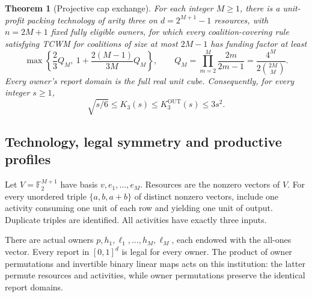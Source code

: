 \documentclass[11pt]{article}
\newtheorem{theorem}{Theorem}[section]
\theoremstyle{definition}\newtheorem{definition}[theorem]{Definition}
\theoremstyle{remark}\newtheorem{remark}[theorem]{Remark}
\begin{document}
\begin{theorem}[Projective cap exchange]\label{thm:projective}
For each integer $M\ge1$, there is a unit-profit packing technology of arity
three on $d=2^{M+1}-1$ resources, with $n=2M+1$ fixed fully eligible owners,
for which every coalition-covering rule satisfying TCWM for coalitions of
size at most $2M-1$ has funding factor at least
\begin{equation}\label{eq:projective-finite}
 \max\left\{\frac23 Q_M,\ 1+\frac{2(M-1)}{3M}Q_M\right\},
 \qquad Q_M=\prod_{m=2}^M\frac{2m}{2m-1}
             =\frac{4^M}{2\binom{2M}{M}}.
\end{equation}
Every owner's report domain is the full real unit cube. Consequently, for
every integer $s\ge1$,
\begin{equation}\label{eq:main-interval}
 \sqrt{s/6}\le K_3(s)\le K_3^{\mathrm{OUT}}(s)\le3s^2.
\end{equation}
\end{theorem}

\subsection{Technology, legal symmetry and productive profiles}
Let $V=\mathbb F_2^{M+1}$ have basis $v,e_1,\ldots,e_M$.
Resources are the nonzero vectors of $V$. For every unordered triple
$\{a,b,a+b\}$ of distinct nonzero vectors, include one activity consuming one
unit of each row and yielding one unit of output. Duplicate triples are
identified. All activities have exactly three inputs.

There are actual owners $p,h_1,\ell_1,\ldots,h_M,\ell_M$, each endowed with
the all-ones vector. Every report in $[0,1]^d$ is legal for every owner.
The product of owner permutations and invertible binary linear maps acts on
this institution: the latter permute resources and activities, while owner
permutations preserve the identical report domains.
\end{document}
